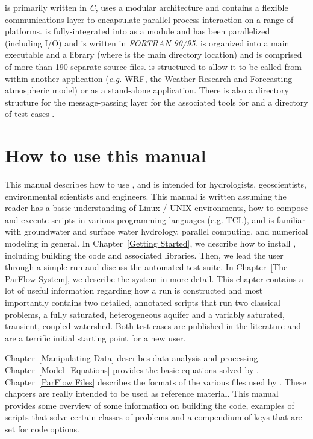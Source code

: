 \parflow{} is primarily written in \emph{C}, uses a modular
architecture and contains a flexible communications layer to
encapsulate parallel process interaction on a range of platforms.
 is fully-integrated into \parflow{} as a module and has
been parallelized (including I/O) and is written in \emph{FORTRAN
  90/95}.  \parflow{} is organized into a main executable
 and a library
 (where  is
the main directory location) and is comprised of more than 190
separate source files.  \parflow{} is structured to allow it to be
called from within another application (\emph{e.g.} WRF, the Weather Research 
and Forecasting atmospheric model) or as a
stand-alone application.  There is also a directory structure for the
message-passing layer  for the
associated tools  for 
 and a directory of test cases
.

\section{How to use this manual}
\label{how to}
This manual describes how to use \parflow{}, and is intended for
hydrologists, geoscientists, environmental scientists and engineers. 
This manual is written assuming the reader has a basic understanding
of Linux / UNIX environments, how to compose and execute scripts in various 
programming languages (e.g. TCL), and is familiar with groundwater and 
surface water hydrology, parallel computing, and numerical modeling in general.
In Chapter~\ref{Getting Started}, we describe how to install \parflow{}, including
building the code and associated libraries. Then, we lead the user through a simple
\parflow{} run and discuss the automated test suite.  In
Chapter~\ref{The ParFlow System}, we describe the \parflow{} system in
more detail.  This chapter contains a lot of useful information regarding how a run is 
constructed and most importantly contains two detailed, annotated scripts that run two
classical \parflow{} problems, a fully saturated, heterogeneous aquifer and a variably 
saturated, transient, coupled watershed.  Both test cases are published in the literature
and are a terrific initial starting point for a new \parflow{} user.

Chapter~\ref{Manipulating Data} describes data analysis and processing. Chapter~\ref{Model_Equations} provides the basic equations solved
by \parflow{}.  Chapter~\ref{ParFlow Files} describes the formats of the
various files used by \parflow{}.  These chapters are really intended to be used as reference material. 
This manual provides some overview of \parflow{}
some information on building the code, examples of scripts that solve certain classes of
problems and a compendium of keys that are set for code options. 
